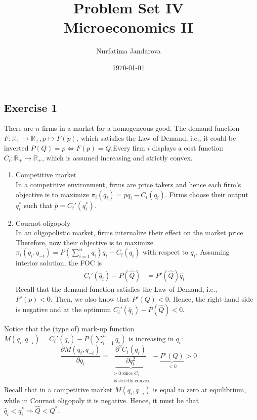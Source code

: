 \documentclass[]{article}
\title{Problem Set IV \\ \large Microeconomics II}
\author{Nurfatima Jandarova}
\date{\today}
\begin{document}
\maketitle

\subsection*{Exercise 1}

There are $n$ firms in a market for a homogeneous good. The demand function $F: \mathbb{R}_{+} \to \mathbb{R}_{+}, p \mapsto F(p)$, which satisfies the Law of Demand, i.e., it could be inverted $P(Q) = p \Leftrightarrow F(p) = Q$.Every firm $i$ displays a cost function $C_i: \mathbb{R}_{+} \to \mathbb{R}_{+}$, which is assumed increasing and strictly convex. 

\begin{enumerate}[label = \alph*)]
	\item Competitive market\\
	In a competitive environment, firms are price takers and hence each firm's objective is to maximize $\pi_i(q_i) = \bar{p}q_i - C_i(q_i)$. Firms choose their output $q_i^*$ such that $\bar{p} = C_i'(q_i^*)$.
	\item Cournot oligopoly\\
	In an oligopolistic market, firms internalize their effect on the market price. Therefore, now their objective is to maximize $\pi_i(q_i, q_{-i}) = P(\sum\limits_{i = 1}^nq_i)q_i - C_i(q_i)$ with respect to $q_i$. Assuming interior solution, the FOC is
	\begin{equation}
		\begin{split}
			C_i'(\hat{q}_i) - P(\hat{Q})& = P'(\hat{Q})\hat{q}_i \nonumber
		\end{split}
	\end{equation}
	Recall that the demand function satisfies the Law of Demand, i.e., $F'(p)<0$. Then, we also know that $P'(Q)<0$. Hence, the right-hand side is negative and at the optimum $C_i'(\hat{q}_i) - P(\hat{Q}) < 0$.
\end{enumerate}

Notice that the (type of) mark-up function $M(q_i, q_{-i}) = C_i'(q_i) - P(\sum\limits_{i = 1}^nq_i)$ is increasing in $q_i$:
\begin{equation}
\frac{\partial M(q_i, q_{-i})}{\partial q_i} = \underbrace{\frac{\partial^2C_i(q_i)}{\partial q_i^2}}_{\substack{>0\text{ since }C_i\\\text{ is strictly convex}}} - \underbrace{P'(Q)}_{<0} > 0 \nonumber
\end{equation}
Recall that in a competitive market $M(q_i, q_{-i})$ is equal to zero at equilibrium, while in Cournot oligopoly it is negative. Hence, it must be that $\hat{q}_i < q_i^* \Longrightarrow \hat{Q} < Q^*$.
\end{document}

